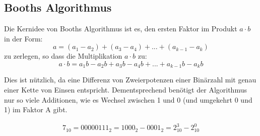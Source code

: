 \documentclass[12pt]{report}
\begin{document}
\subsection{Booths Algorithmus}
\begin{defbox}
  Die Kernidee von Booths Algorithmus ist es, den ersten Faktor im Produkt $a \cdot b$ in der Form:
  $$a = (a_1 - a_2) + (a_3 - a_4) + ... + (a_{k-1} - a_k)$$
  zu zerlegen, so dass die Multiplikation $a \cdot b$ zu:
  $$a \cdot b = a_1b - a_2b + a_3b - a_4b + ... + a_{k-1}b - a_kb$$

  Dies ist nützlich, da eine Differenz von Zweierpotenzen einer Binärzahl mit genau einer Kette von Einsen entspricht.
  Dementsprechend benötigt der Algorithmus nur so viele Additionen, wie es Wechsel zwischen 1 und 0 (und umgekehrt 0 und 1) im Faktor A gibt.

  \begin{align*}
    7_{10} = 00000111_2 = 1000_2 - 0001_2 = 2^3_{10} - 2^0_{10}
  \end{align*}
\end{defbox}
\end{document}
